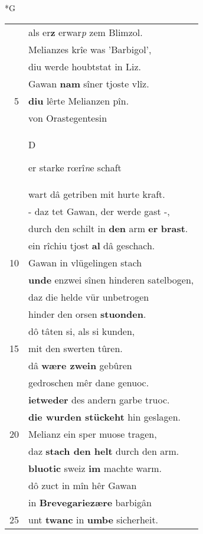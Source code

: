 \documentclass[8pt,a4paper,notitlepage]{article}
\begin{document}
\newpage
\begin{table}[ht]
\begin{minipage}[t]{0.5\linewidth}
\small
\begin{center}*G
\end{center}
\begin{tabular}{rl}
 & als er\textbf{z} erwar\textit{p} zem Blimzol.\\ 
 & Melianzes krîe was 'Barbigol',\\ 
 & diu werde houbtstat in Liz.\\ 
 & Gawan \textbf{nam} sîner tjoste vlîz.\\ 
5 & \textbf{diu} lêrte Melianzen pîn.\\ 
 & von Orastegentesin\\ 
 & \begin{large}D\end{large}er starke rœrî\textit{n}e schaft\\ 
 & wart dâ getriben mit hurte kraft.\\ 
 & - daz tet Gawan, der werde gast -,\\ 
 & durch den schilt in \textbf{den} arm \textbf{er} \textbf{brast}.\\ 
 & ein rîchiu tjost \textbf{al} dâ geschach.\\ 
10 & Gawan in vlügelingen stach\\ 
 & \textbf{unde} enzwei sînen hinderen satelbogen,\\ 
 & daz die helde vür unbetrogen\\ 
 & hinder den orsen \textbf{stuonden}.\\ 
 & dô tâten si, als si kunden,\\ 
15 & mit den swerten tûren.\\ 
 & dâ \textbf{wære zwein} gebûren\\ 
 & gedroschen mêr dane genuoc.\\ 
 & \textbf{ietweder} des andern garbe truoc.\\ 
 & \textbf{die wurden stückeht} hin geslagen.\\ 
20 & Melianz ein sper muose tragen,\\ 
 & daz \textbf{stach den helt} durch den arm.\\ 
 & \textbf{bluotic} sweiz \textbf{im} machte warm.\\ 
 & dô zuct in mîn hêr Gawan\\ 
 & in \textbf{Brevegariezære} barbigân\\ 
25 & unt \textbf{twanc} in \textbf{umbe} sicherheit.\\ 

\end{tabular}
\end{minipage}
\end{table}
\end{document}
